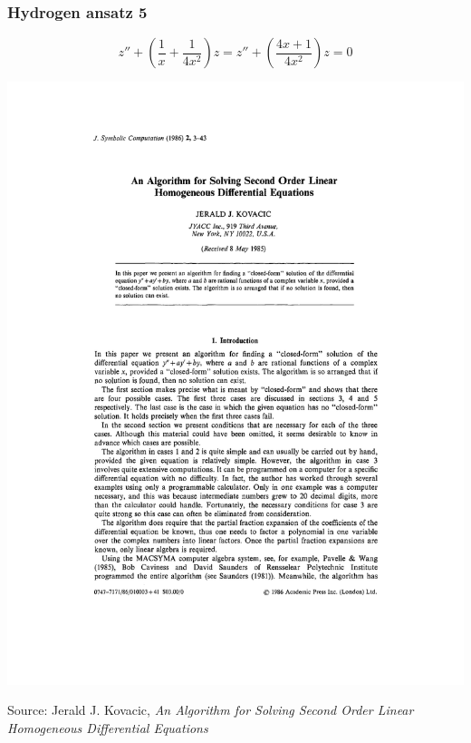 \documentclass{beamer}
\begin{document}
\begin{frame}[fragile]
\frametitle{Hydrogen ansatz 5}
\small

$$z'' + \left(\frac{1}{x} + \frac{1}{4x^2}\right) z = z'' + \left(\frac{4x + 1}{4x^2}\right) z = 0$$

\includegraphics[page=6,clip,trim=0in 2in 0in 5in, width=\textwidth]{Kovacic.pdf}

{\tiny Source: Jerald J. Kovacic, {\it An Algorithm for Solving Second Order Linear Homogeneous Differential Equations}}
\end{frame}
\end{document}
